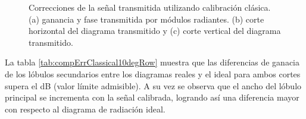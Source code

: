 \begin{figure}[H]
	\centering

	\caption{Correcciones de la señal transmitida utilizando calibración clásica. (a) ganancia y fase transmitida por módulos
		radiantes. (b) corte horizontal del diagrama transmitido y (c) corte vertical del diagrama transmitido.}
	\label{fig:compErrClassical10degRow}
\end{figure}

La tabla \ref{tab:compErrClassical10degRow} muestra que las diferencias de ganacia de los lóbulos secundarios entre los diagramas 
reales y el ideal para ambos cortes supera el dB (valor límite admisible). A su vez se observa que el ancho del lóbulo 
principal se incrementa con la señal calibrada, logrando así una diferencia mayor con respecto al diagrama de radiación ideal.

